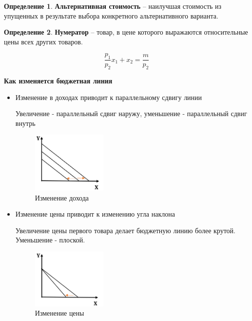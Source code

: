 \documentclass[reqno]{article}
\theoremstyle{definition}
\theoremstyle{definition}
\theoremstyle{definition}
\theoremstyle{definition}
\theoremstyle{definition}
\theoremstyle{definition}
\theoremstyle{definition}
\newtheorem*{defi}{Определение}
\theoremstyle{definition}
\theoremstyle{definition}
\begin{document}
			\begin{defi}
				\textbf{Альтернативная стоимость} -- наилучшая стоимость из упущенных в результате выбора конкретного альтернативного варианта.
			\end{defi} 
			
			\begin{defi}
				\textbf{Нумератор} -- товар, в цене которого выражаются относительные цены всех других товаров.
			\end{defi}
			$$\dfrac{p_1}{p_2} x_1 + x_2 = \dfrac{m}{p_2}$$
			
			\textbf{Как изменяется бюджетная линия}
			\begin{itemize}
				\item Изменение в доходах приводит к параллельному сдвигу линии
				
				Увеличение - параллельный сдвиг наружу, уменьшение - параллельный сдвиг внутрь 
				
				\begin{figure}[h!]
					\centering
					\includegraphics[width=0.35\textwidth]{Линия_бюджета_изменение_дохода}
					\caption{Изменение дохода}
				\end{figure}
				
				\item Изменение цены приводит к изменению угла наклона
				
				Увеличение цены первого товара делает бюджетную линию более крутой. Уменьшение - плоской.
				
				\begin{figure}[h!]
					\centering
					\includegraphics[width=0.35\textwidth]{Линия_бюджета_изменение_цены}
					\caption{Изменение цены}
				\end{figure}
				

\end{itemize}
\end{document}
